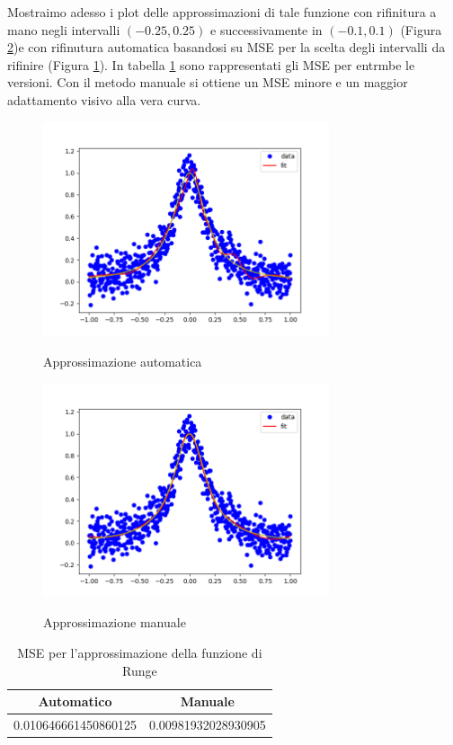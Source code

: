\documentclass[../main.tex]{subfiles}
\begin{document}
Mostraimo adesso i plot delle approssimazioni di tale funzione con rifinitura a mano negli intervalli $(-0.25,0.25)$ e successivamente 
in $(-0.1,0.1)$
(Figura \ref{fig:runge_mano})e con rifinutura automatica basandosi su MSE per la scelta degli intervalli da rifinire 
(Figura \ref{fig:runge_auto}).
In tabella \ref{tab:runge} sono rappresentati gli MSE per entrmbe le versioni. Con il metodo manuale si ottiene un MSE minore 
e un maggior adattamento visivo alla vera curva.
\begin{figure}[h!]
    \caption{Approssimazione automatica}
    \includegraphics[width=0.75\textwidth]{Immagini/esempi/runge_auto.png}
    \centering
    \label{fig:runge_auto}
\end{figure}
\begin{figure}[h!]
    \caption{Approssimazione manuale}
    \includegraphics[width=0.75\textwidth]{Immagini/esempi/runge_mano.png}
    \centering
    \label{fig:runge_mano}
\end{figure}


\begin{table}[h!]
    \centering
     \begin{tabular}{||c c ||} 
     \hline
     Automatico & Manuale \\ [0.5ex] 
     \hline\hline
     0.010646661450860125 & 0.00981932028930905 \\  [1ex] 
     \hline
     \end{tabular}
     \label{tab:runge}
     \caption{MSE per l'approssimazione della funzione di Runge}
    \end{table}
\end{document}

